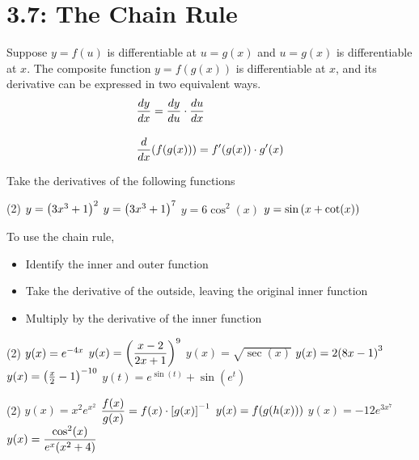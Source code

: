 \documentclass[mathNotesPreamble]{subfiles}
\begin{document}
\section{3.7: The Chain Rule}

\begin{thmBox*}
  Suppose $y=f(u)$ is differentiable at $u=g(x)$ and $u=g(x)$ is differentiable at $x$. The composite function $y=f(g(x))$ is differentiable at $x$, and its derivative can be expressed in two equivalent ways.
    \begin{align}
      &\dfrac{dy}{dx} = \dfrac{dy}{du}\cdot \dfrac{du}{dx}\\[10pt]
      &\dfrac{d}{dx}\parens{f\parens{g(x)}}=f'\parens{g(x)}\cdot g'(x)
    \end{align}
\end{thmBox*}

\begin{ex*}
  Take the derivatives of the following functions
\end{ex*}
\begin{tasks}[after-item-skip=\stretch{1}](2)
  \task $y=\parens{3x^3+1}^2$
  \task $y=\parens{3x^3+1}^7$
  \task $y=6\cos^2(x)$
  \task $y=\sin\parens{x+\cot(x)}$
\end{tasks}

\begin{thmBox*}
  To use the chain rule,
    \begin{itemize}
      \item Identify the inner and outer function
      \item Take the derivative of the outside, leaving the original inner function
      \item Multiply by the derivative of the inner function
    \end{itemize}
\end{thmBox*}
\pagebreak

\begin{tasks}[resume, after-item-skip=\stretch{1}](2)
  \task $y(x)=e\inv[4x]$
  \task $y(x)=\parens{\dfrac{x-2}{2x+1}}^9$
  \task $y(x)=\sqrt{\sec(x)}$
  \task $y(x)=2\parens{8x-1}^3$
  \task $y(x)=\parens{\frac{x}{2}-1}\inv[10]$
  \task $y(t)=e^{\sin(t)}+\sin(e^t)$
\end{tasks}
\pagebreak

\begin{tasks}[resume, after-item-skip=\stretch{1}](2)
  \task $y(x)=x^2 e^{x^2}$
  \task $\dfrac{f(x)}{g(x)}=f(x)\cdot\sbrkt{g(x)}\inv$
  \task $y(x)=f\parens{g\parens{h(x)}}$
  \task $y(x)=-12e^{3x^7}$
  \task* $y(x)=\dfrac{\cos^2(x)}{e^x\parens{x^2+4}}$
  
\end{tasks}
\pagebreak
\end{document}
